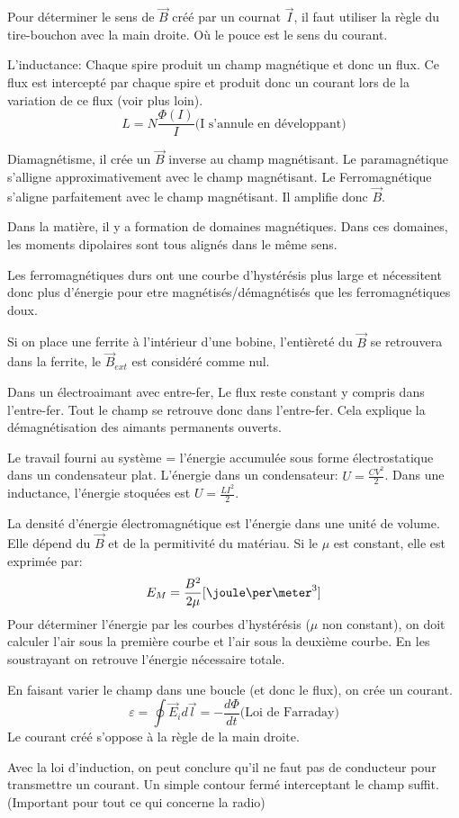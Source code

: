\documentclass[11pt,a4paper]{article} %
\newcommand{\B}{\vec B}
\newcommand{\EMF}{\varepsilon}
\begin{document}
Pour déterminer le sens de $\B$ créé par un cournat $\vec I$, il faut utiliser la règle du tire-bouchon avec la main droite. Où le pouce est le sens du courant.

L'inductance: Chaque spire produit un champ magnétique et donc un flux. Ce flux est intercepté par chaque spire et produit donc un courant lors de la variation de ce flux (voir plus loin).
$$L = N\frac{\Phi(I)}{I} \textrm{(I s'annule en développant)}$$ 

Diamagnétisme, il crée un $\B$ inverse au champ magnétisant. Le paramagnétique s'alligne approximativement avec le champ magnétisant. Le Ferromagnétique s'aligne parfaitement avec le champ magnétisant. Il amplifie donc $\B$.

Dans la matière, il y a formation de domaines magnétiques. Dans ces domaines, les moments dipolaires sont tous alignés dans le même sens.

Les ferromagnétiques durs ont une courbe d'hystérésis plus large et nécessitent donc plus d'énergie pour etre magnétisés/démagnétisés que les ferromagnétiques doux.

Si on place une ferrite à l'intérieur d'une bobine, l'entièreté du $\B$ se retrouvera dans la ferrite, le $\B_{ext}$ est considéré comme nul.

Dans un électroaimant avec entre-fer, Le flux reste constant y compris dans l'entre-fer.
Tout le champ se retrouve donc dans l'entre-fer. Cela explique la démagnétisation des aimants permanents ouverts.

Le travail fourni au système = l'énergie accumulée sous forme électrostatique dans un condensateur plat.
L'énergie dans un condensateur: $U = \frac{CV^2}{2}$.
Dans une inductance, l'énergie stoquées est $U = \frac{LI^2}{2}$.

La densité d'énergie électromagnétique est l'énergie dans une unité de volume.
Elle dépend du $\B$ et de la permitivité du matériau. Si le $\mu$ est constant, elle est exprimée par:
$$E_M =  \frac{B^2}{2\mu} [\joule\per\meter^3]$$
Pour déterminer l'énergie par les courbes d'hystérésis ($\mu$ non constant), on doit calculer l'air sous la première courbe et l'air sous la deuxième courbe. En les soustrayant on retrouve l'énergie nécessaire totale.

En faisant varier le champ dans une boucle (et donc le flux), on crée un courant.
$$\EMF = \oint \vec E_i d\vec l = -\frac{d\Phi}{dt} \textrm{(Loi de Farraday)}$$
Le courant créé s'oppose à la règle de la main droite.

Avec la loi d'induction, on peut conclure qu'il ne faut pas de conducteur pour transmettre un courant. Un simple contour fermé interceptant le champ suffit. (Important pour tout ce qui concerne la radio)
\end{document}
